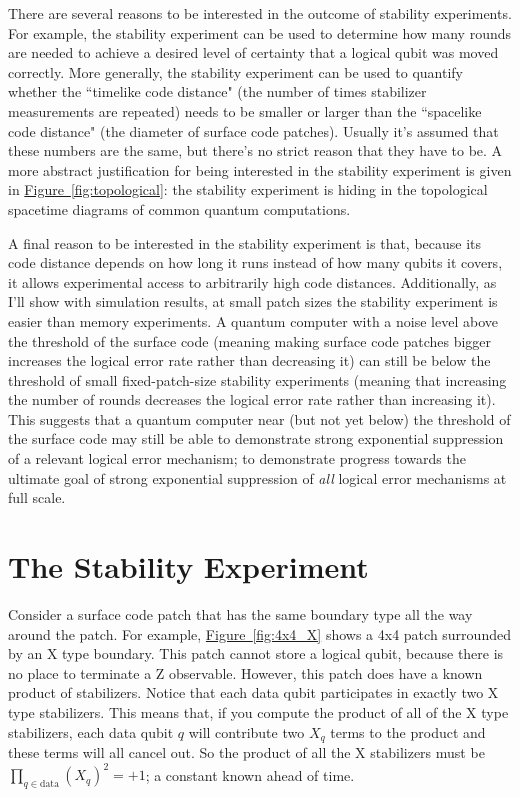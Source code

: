 \documentclass[onecolumn,unpublished,a4paper]{quantumarticle}
\theoremstyle{definition}
\theoremstyle{definition}
\theoremstyle{definition}
\newcommand{\fig}[1]{\hyperref[fig:#1]{Figure~\ref*{fig:#1}}}
\begin{document}
There are several reasons to be interested in the outcome of stability experiments.
For example, the stability experiment can be used to determine how many rounds are needed to achieve a desired level of certainty that a logical qubit was moved correctly.
More generally, the stability experiment can be used to quantify whether the ``timelike code distance" (the number of times stabilizer measurements are repeated) needs to be smaller or larger than the ``spacelike code distance" (the diameter of surface code patches).
Usually it's assumed that these numbers are the same, but there's no strict reason that they have to be.
A more abstract justification for being interested in the stability experiment is given in \fig{topological}: the stability experiment is hiding in the topological spacetime diagrams of common quantum computations.

A final reason to be interested in the stability experiment is that, because its code distance depends on how long it runs instead of how many qubits it covers, it allows experimental access to arbitrarily high code distances.
Additionally, as I'll show with simulation results, at small patch sizes the stability experiment is easier than memory experiments.
A quantum computer with a noise level above the threshold of the surface code (meaning making surface code patches bigger increases the logical error rate rather than decreasing it) can still be below the threshold of small fixed-patch-size stability experiments (meaning that increasing the number of rounds decreases the logical error rate rather than increasing it).
This suggests that a quantum computer near (but not yet below) the threshold of the surface code may still be able to demonstrate strong exponential suppression of a relevant logical error mechanism; to demonstrate progress towards the ultimate goal of strong exponential suppression of \emph{all} logical error mechanisms at full scale.

\section{The Stability Experiment}

Consider a surface code patch that has the same boundary type all the way around the patch.
For example, \fig{4x4_X} shows a 4x4 patch surrounded by an X type boundary.
This patch cannot store a logical qubit, because there is no place to terminate a Z observable.
However, this patch does have a known product of stabilizers.
Notice that each data qubit participates in exactly two X type stabilizers.
This means that, if you compute the product of all of the X type stabilizers, each data qubit $q$ will contribute two $X_q$ terms to the product and these terms will all cancel out.
So the product of all the X stabilizers must be $\prod_{q \in \text{data}} (X_q)^2 = +1$; a constant known ahead of time.
\end{document}
